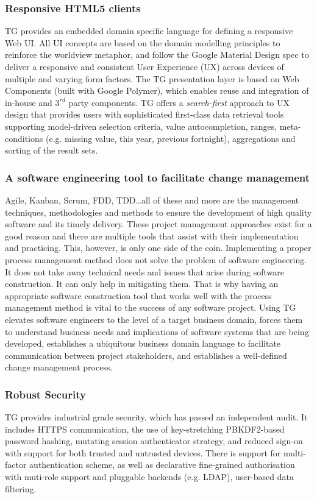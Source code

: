 \documentclass[a4paper,10pt,twocolumn,oneside,openright,final]{memoir}
\begin{document}

\subsubsection*{Responsive HTML5 clients}
	TG provides an embedded domain specific language for defining a responsive Web UI.
	All UI concepts are based on the domain modelling principles to reinforce the worldview metaphor, and follow the Google Material Design spec to deliver a responsive and consistent User Experience (UX) across devices of multiple and varying form factors.
	The TG presentation layer is based on Web Components (built with Google Polymer), which enables reuse and integration of in-house and $3^{rd}$ party components.
	TG offers a \emph{search-first} approach to UX design that provides users with sophisticated first-class data retrieval tools supporting model-driven selection criteria, value autocompletion, ranges, meta-conditions (e.g. missing value, this year, previous fortnight), aggregations and sorting of the result sets.


\subsubsection*{A software engineering tool to facilitate change management}
	Agile, Kanban, Scrum, FDD, TDD\ldots all of these and more are the management techniques, methodologies and methods to ensure the development of high quality software and its timely delivery.
	These project management approaches exist for a good reason and there are multiple tools that assist with their implementation and practicing.
	This, however, is only one side of the coin.
	Implementing a proper process management method does not solve the problem of software engineering.
	It does not take away technical needs and issues that arise during software construction.
	It can only help in mitigating them.
	That is why having an appropriate software construction tool that works well with the process management method is vital to the success of any software project.
	Using TG elevates software engineers to the level of a target business domain, forces them to understand business needs and implications of software systems that are being developed, establishes a ubiquitous business domain language to facilitate communication between project stakeholders, and establishes a well-defined change management process.

\subsubsection*{Robust Security}
	TG provides industrial grade security, which has passed an independent audit.
	It includes HTTPS communication, the use of key-stretching PBKDF2-based password hashing, mutating session authenticator strategy, and reduced sign-on with support for both trusted and untrusted devices.
	There is support for multi-factor authentication scheme, as well as declarative fine-grained authorisation with muti-role support and pluggable backends (e.g. LDAP), user-based data filtering.
\end{document}
